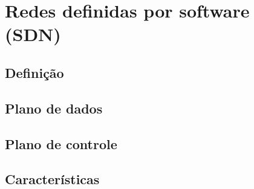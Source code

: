 \section{Redes definidas por software (SDN)}


\subsection{Definição}


\subsection{Plano de dados}


\subsection{Plano de controle}


\subsection{Características}
